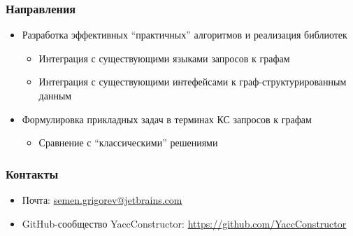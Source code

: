 \documentclass[xcolor=table]{beamer}
\begin{document}
\begin{frame}
  \transwipe[direction=90]
  \frametitle{Направления}

\begin{itemize} 
\item Разработка эффективных ``практичных'' алгоритмов и реализация библиотек
\begin{itemize} 
\item Интеграция с существующими языками запросов к графам
\item Интеграция с существующими интефейсами к граф-структурированным данным
\end{itemize}

\item Формулировка прикладных задач в терминах КС запросов к графам
\begin{itemize} 
\item Сравнение с ``классическими'' решениями
\end{itemize}

\end{itemize}

\end{frame}

            
\begin{frame}
\transwipe[direction=90]
\frametitle{Контакты}
\begin{itemize}
  \item Почта: \url{semen.grigorev@jetbrains.com}
  \item GitHub-сообщество YaccConstructor: \url{https://github.com/YaccConstructor}
\end{itemize}
\end{frame}
\end{document}
